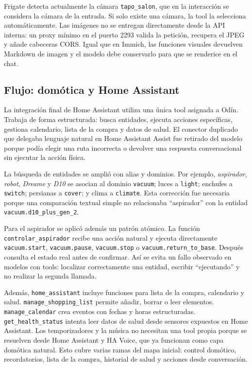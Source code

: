 Frigate detecta actualmente la cámara \texttt{tapo\_salon}, que en la interacción se considera la cámara de la entrada. Si solo existe una cámara, la tool la selecciona automáticamente. Las imágenes no se entregan directamente desde la API interna: un proxy mínimo en el puerto 2293 valida la petición, recupera el JPEG y añade cabeceras CORS. Igual que en Immich, las funciones visuales devuelven Markdown de imagen y el modelo debe conservarlo para que se renderice en el chat.


\subsection{Flujo: domótica y Home Assistant}
La integración final de Home Assistant utiliza una única tool asignada a Odín. Trabaja de forma estructurada: busca entidades, ejecuta acciones específicas, gestiona calendario, lista de la compra y datos de salud. El conector duplicado que delegaba lenguaje natural en Home Assistant Assist fue retirado del modelo porque podía elegir una ruta incorrecta o devolver una respuesta conversacional sin ejecutar la acción física.

La búsqueda de entidades se amplió con alias y dominios. Por ejemplo, \textit{aspirador}, \textit{robot}, \textit{Dreame} y \textit{D10} se asocian al dominio \texttt{vacuum}; luces a \texttt{light}; enchufes a \texttt{switch}; persianas a \texttt{cover}; y clima a \texttt{climate}. Esta corrección fue necesaria porque una comparación textual simple no relacionaba ``aspirador'' con la entidad \texttt{vacuum.d10\_plus\_gen\_2}.

Para el aspirador se aplicó además un patrón atómico. La función \texttt{controlar\_aspirador} recibe una acción natural y ejecuta directamente \texttt{vacuum.start}, \texttt{vacuum.pause}, \texttt{vacuum.stop} o \texttt{vacuum.return\_to\_base}. Después consulta el estado real antes de confirmar. Así se evita un fallo observado en modelos con tools: localizar correctamente una entidad, escribir ``ejecutando'' y no realizar la segunda llamada.

Además, \texttt{home\_assistant} incluye funciones para lista de la compra, calendario y salud. \texttt{manage\_shopping\_list} permite añadir, borrar o leer elementos. \texttt{manage\_calendar} crea eventos con fechas y horas estructuradas. \texttt{get\_health\_status} intenta leer datos de salud desde sensores expuestos en Home Assistant. Los temporizadores y la música no necesitan una tool propia porque se resuelven desde Home Assistant y HA Voice, que ya funcionan como capa domótica natural. Esto cubre varias ramas del mapa inicial: control domótico, recordatorios, lista de la compra, historial de salud y acciones desde conversación.

